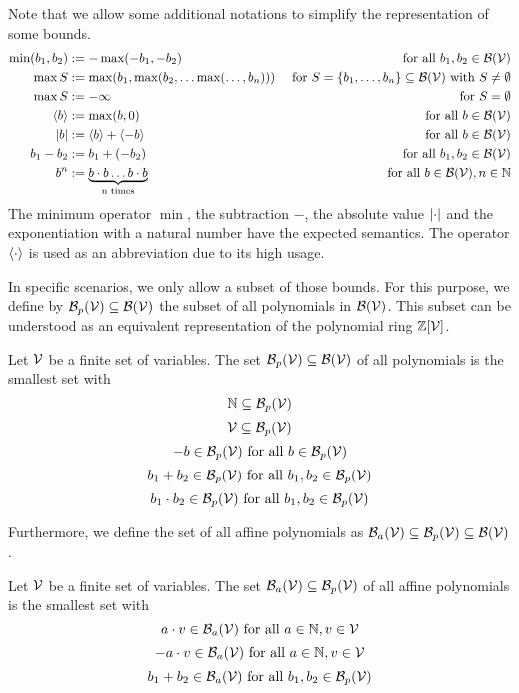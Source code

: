 Note that we allow some additional notations to simplify the representation of some bounds.
\begin{align*}
  \min(b_1,b_2) &:= -\max(-b_1,-b_2) & \text{ for all } b_1, b_2 \in \mathcal{B}(\mathcal{V}) \\
  \max S &:= \max(b_1, \max(b_2, \dots \max(\dots, b_n))) & \text{ for } S = \lbrace b_1, \dots, b_n \rbrace \subseteq \mathcal{B}(\mathcal{V}) \text{ with } S \neq \emptyset \\
  \max S &:= -\infty & \text{ for } S = \emptyset \\
  \langle b\rangle &:= \max(b,0) & \text{ for all } b \in \mathcal{B}(\mathcal{V}) \\
  \left|b\right| &:= \langle b\rangle + \langle-b\rangle & \text{ for all } b \in \mathcal{B}(\mathcal{V}) \\
  b_1 - b_2 &:= b_1 + (-b_2) & \text{ for all } b_1, b_2 \in \mathcal{B}(\mathcal{V}) \\
  b^n &:= \underbrace{b \cdot b \dots b \cdot b}_\text{n times} & \text{ for all } b \in \mathcal{B}(\mathcal{V}), n \in \mathbb{N}
\end{align*}
The minimum operator $\min$, the subtraction $-$, the absolute value $\left|\cdot\right|$ and the exponentiation with a natural number have the expected semantics.
The operator $\langle\cdot\rangle$ is used as an abbreviation due to its high usage.

In specific scenarios, we only allow a subset of those bounds.
For this purpose, we define by $\mathcal{B}_p(\mathcal{V}) \subseteq \mathcal{B}(\mathcal{V})$ the subset of all polynomials in $\mathcal{B}(\mathcal{V})$.
This subset can be understood as an equivalent representation of the polynomial ring $\mathbb{Z}[\mathcal{V}]$.
\begin{definition}
  Let $\mathcal{V}$ be a finite set of variables.
  The set $\mathcal{B}_p(\mathcal{V}) \subseteq \mathcal{B}(\mathcal{V})$ of all polynomials is the smallest set with
  \[ \mathbb{N} \subseteq \mathcal{B}_p(\mathcal{V}) \] 
  \[ \mathcal{V} \subseteq \mathcal{B}_p(\mathcal{V}) \] 
  \[ -b \in \mathcal{B}_p(\mathcal{V}) \text{ for all } b \in \mathcal{B}_p(\mathcal{V}) \] 
  \[ b_1 + b_2 \in \mathcal{B}_p(\mathcal{V}) \text{ for all } b_1, b_2 \in \mathcal{B}_p(\mathcal{V}) \] 
  \[ b_1 \cdot b_2 \in \mathcal{B}_p(\mathcal{V}) \text{ for all } b_1, b_2 \in \mathcal{B}_p(\mathcal{V}) \] 
\end{definition}
Furthermore, we define the set of all affine polynomials as $\mathcal{B}_a(\mathcal{V}) \subseteq \mathcal{B}_p(\mathcal{V}) \subseteq \mathcal{B}(\mathcal{V})$. 
\begin{definition}
  Let $\mathcal{V}$ be a finite set of variables.
  The set $\mathcal{B}_a(\mathcal{V}) \subseteq \mathcal{B}_p(\mathcal{V})$ of all affine polynomials is the smallest set with
  \[ a \cdot v \in \mathcal{B}_a(\mathcal{V}) \text{ for all } a \in \mathbb{N}, v \in \mathcal{V} \] 
  \[ -a \cdot v \in \mathcal{B}_a(\mathcal{V}) \text{ for all } a \in \mathbb{N}, v \in \mathcal{V} \] 
  \[ b_1 + b_2 \in \mathcal{B}_a(\mathcal{V}) \text{ for all } b_1, b_2 \in \mathcal{B}_p(\mathcal{V}) \] 
\end{definition}

